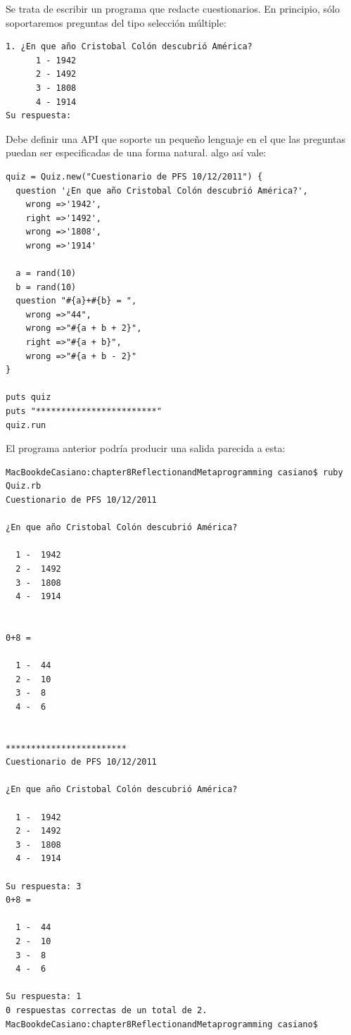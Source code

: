\label{sectionpractica:DSL}
Se trata de escribir un programa que redacte cuestionarios.
En principio, sólo soportaremos preguntas del tipo selección múltiple:

\begin{verbatim}
1. ¿En que año Cristobal Colón descubrió América?
      1 - 1942
      2 - 1492
      3 - 1808
      4 - 1914
Su respuesta:
\end{verbatim}
Debe definir una API que soporte un pequeño lenguaje
en el que las preguntas puedan ser especificadas de una forma natural.
algo así vale:

\begin{verbatim}
quiz = Quiz.new("Cuestionario de PFS 10/12/2011") {
  question '¿En que año Cristobal Colón descubrió América?',
    wrong =>'1942',
    right =>'1492',
    wrong =>'1808',
    wrong =>'1914'
  
  a = rand(10)
  b = rand(10)
  question "#{a}+#{b} = ",
    wrong =>"44",
    wrong =>"#{a + b + 2}",
    right =>"#{a + b}",
    wrong =>"#{a + b - 2}"
}

puts quiz
puts "************************"
quiz.run
\end{verbatim}
El programa anterior podría producir una salida parecida a esta:

\begin{verbatim}
MacBookdeCasiano:chapter8ReflectionandMetaprogramming casiano$ ruby Quiz.rb 
Cuestionario de PFS 10/12/2011

¿En que año Cristobal Colón descubrió América?

  1 -  1942
  2 -  1492
  3 -  1808
  4 -  1914


0+8 = 

  1 -  44
  2 -  10
  3 -  8
  4 -  6


************************
Cuestionario de PFS 10/12/2011

¿En que año Cristobal Colón descubrió América?

  1 -  1942
  2 -  1492
  3 -  1808
  4 -  1914

Su respuesta: 3
0+8 = 

  1 -  44
  2 -  10
  3 -  8
  4 -  6

Su respuesta: 1
0 respuestas correctas de un total de 2.
MacBookdeCasiano:chapter8ReflectionandMetaprogramming casiano$ 
\end{verbatim}


